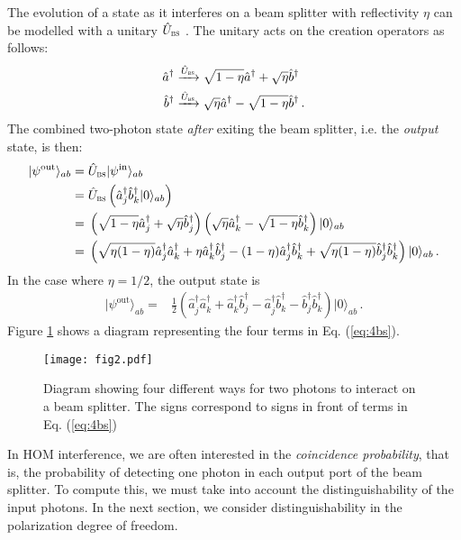 \documentclass[12pt]{article}
\newcommand{\ket}[2] {| #1 \rangle_{#2}}
\newcommand{\dg}{^{\dagger}}
\begin{document}
The evolution of a state as it interferes on a beam splitter with reflectivity $\eta$ can be modelled with a unitary $\hat{U}_{\textsc{bs}}$ \cite{Bachor2004}. The unitary acts on the creation operators as follows:
\begin{subequations}\label{eq:unitary}
\begin{align}
\hat{a}\dg\xrightarrow{\hat{U}_{\textsc{bs}}} {}&\sqrt{1-\eta}\hat{a}\dg+\sqrt{\eta}\hat{b}\dg\\
\hat{b}\dg\xrightarrow{\hat{U}_{\textsc{bs}}}{}&\sqrt{\eta}\hat{a}\dg-\sqrt{1-\eta}\hat{b}\dg\,.
\end{align}
\end{subequations}
The combined two-photon state \emph{after} exiting the beam splitter, i.e. the \emph{output} state, is then:
\begin{align}
\ket{\psi^{\mathrm{out}}}{ab}={}&\hat{U}_{\textsc{bs}}\ket{\psi^{\mathrm{in}}}{ab}\\
={}&\hat{U}_{\textsc{bs}}\left(\hat{a}\dg_{j}\hat{b}\dg_{k}\ket{0}{ab}\right)\\
={}&\left(\sqrt{1-\eta}\hat{a}\dg_j+\sqrt{\eta}\hat{b}\dg_j\right)\left(\sqrt{\eta}\hat{a}\dg_k-\sqrt{1-\eta}\hat{b}\dg_k\right)\ket{0}{ab}\\
={}&\left(\sqrt{\eta(1-\eta)}\hat{a}\dg_{j}\hat{a}\dg_{k}+\eta\hat{a}\dg_{k}\hat{b}\dg_{j}-(1-\eta)\hat{a}\dg_{j}\hat{b}\dg_{k}+\sqrt{\eta(1-\eta)}\hat{b}\dg_{j}\hat{b}\dg_{k}\right)\ket{0}{ab}\,.
\end{align}
In the case where $\eta=1/2$, the output state is 
\begin{align}\label{eq:4bs}
\ket{\psi^{\mathrm{out}}}{ab}={}&\frac{1}{2}\left(\hat{a}\dg_{j}\hat{a}\dg_{k}+\hat{a}\dg_{k}\hat{b}\dg_{j}-\hat{a}\dg_{j}\hat{b}\dg_{k}-\hat{b}\dg_{j}\hat{b}\dg_{k}\right)\ket{0}{ab}\,.
\end{align}
Figure \ref{fig:4bs} shows a diagram representing the four terms in Eq. (\ref{eq:4bs}). \\

\begin{figure}[h]
\begin{center}
\texttt{[image: fig2.pdf]}
\caption{Diagram showing four different ways for two photons to interact on a beam splitter. The signs correspond to signs in front of terms in Eq. (\ref{eq:4bs}) }
\label{fig:4bs}
\end{center}
\end{figure}


In HOM interference, we are often interested in the \emph{coincidence probability}, that is, the probability of detecting one photon in each output port of the beam splitter. To compute this, we must  take into account the distinguishability of the input photons. In the next section, we consider distinguishability in the polarization degree of freedom.
\end{document}
